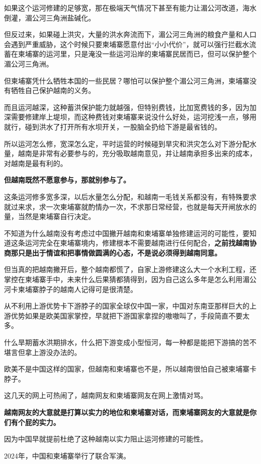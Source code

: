 \documentclass[UTF8, 11pt, oneside]{ctexart}
\newcommand{\zd}[1]{\textbf{\textcolor[RGB]{123,12,0}{#1}}} %
\begin{document}
如果这个运河修建的足够宽，那在极端天气情况下甚至有能力让湄公河改道，海水倒灌，湄公河三角洲盐碱化。

但反过来，如果碰上洪灾，大量的洪水奔流而下，湄公河三角洲的粮食产量和人口会遇到严重威胁，这个时候只要柬埔寨愿意付出“小小代价”，就可以强行拦截水流蓄在柬埔寨的运河里，只是淹没一些运河沿岸的柬埔寨民居而已，但可以保护整个湄公河三角洲。

但柬埔寨凭什么牺牲本国的一些民居？哪怕可以保护整个湄公河三角洲，柬埔寨没有牺牲自己保护越南的义务。

而且运河越深，这种蓄洪保护能力就越强，但特别费钱，比加宽费钱的多，因为加深需要修建岸上堤坝，而这种费钱对柬埔寨来说没什么好处，运河挖浅一点，够用就行，碰到洪水了打开所有水坝开关，一股脑全扔给下游是最省钱的。

所以运河怎么修，宽深怎么定，平时运营的时候碰到旱灾和洪灾怎么对下游分配水量，越南是非常有必要参与的，充分吸取越南意见，并让越南承担多出来的成本，对越南是最有利的。

\zd{但越南既然不愿意参与，那就别参与了。}

这条运河修多宽多深，以后水量怎么分配，和越南一毛钱关系都没有，有特殊要求就过来求，求一次柬埔寨就酌情办一次，不求那日常经营，也就是每天开闸放水的量，当然是柬埔寨自行决定。

不知道为什么越南没有考虑过中国撇开越南和柬埔寨单独修建运河的可能性，要知道这条运河完全在柬埔寨境内，修建根本不需要越南进行任何配合，\zd{之前找越南协商那只是出于情谊和把事情做圆满的心态，不是说必须得到越南同意。}

但当真的把越南撇开后，整个越南都慌了，自家上游修建这么大一个水利工程，还掌控在柬埔寨手中，未来什么后果猜都猜得到，因为自己这么多年是怎么利用湄公河卡柬埔寨脖子的越南人记得可是很清楚。

从不利用上游优势卡下游脖子的国家全球仅中国一家，中国对东南亚那样巨大的上游优势如果是欧美国家掌控，早就把下游国家拿捏的嗷嗷叫了，手段简直不要太多。

什么旱期蓄水洪期排水，什么把下游变成小型恒河，每一种都是能把下游搞的苦不堪言但拿上游没办法的。

欧美不是中国这样的国家，但越南和柬埔寨也不是，所以越南很怕自己被柬埔寨卡脖子。

这几天的网上可热闹了，越南网友和柬埔寨网友在网上激情对骂。

\zd{越南网友的大意就是打算以实力的地位和柬埔寨对话，而柬埔寨网友的大意就是你们有个屁的实力。}

因为中国早就提前杜绝了这种越南以实力阻止运河修建的可能性。

2024年，中国和柬埔寨举行了联合军演。
\end{document}
